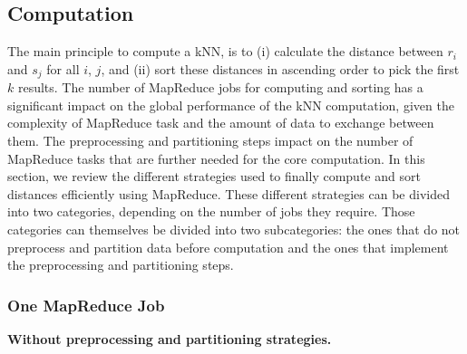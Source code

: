 \subsection{Computation} 

The main principle to compute a kNN, is to (i) calculate the distance between $r_i$ and $s_j$ for all $i$, 
$j$, and (ii) sort these distances in ascending order to 
pick the first $k$ results. The number of MapReduce jobs for computing and sorting has
a significant impact on the global performance of the kNN computation, given the complexity of MapReduce task and the amount of data to exchange between them. 
The preprocessing and partitioning steps impact on the number of MapReduce tasks that are further needed for the core computation. 
In this section, we review the 
different strategies used to finally compute and sort distances efficiently using MapReduce. These different strategies can be divided into two categories, depending on the number of jobs they require. Those categories can themselves be divided into two subcategories: the ones that do 
not preprocess and partition data before computation and the ones that implement the preprocessing and partitioning steps. 

\subsubsection{One MapReduce Job}

\noindent \textbf{Without preprocessing and partitioning strategies.} 

